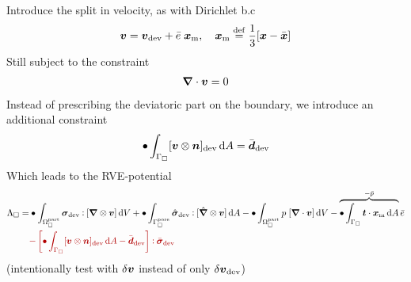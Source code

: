 \documentclass[a4paper]{article}
\newcommand{\pore}{\mathrm{pore}}
\newcommand{\particle}{\mathrm{part}}
\newcommand{\highlight}[1]{{\color{red!70!black}#1}}
\begin{document}
% 
Introduce the split in velocity, as with Dirichlet b.c
\begin{gather}
 \boldsymbol{v} = \boldsymbol{v}_{\mathrm{dev}} + \bar{e}\;\boldsymbol{x}_{\mathrm{m}}, \quad \boldsymbol{x}_{\mathrm{m}} \overset{\mathrm{def}}{=} \frac13 [\boldsymbol{x} - \bar{\boldsymbol{x}}]
\end{gather}
Still subject to the constraint
\begin{gather}
 \boldsymbol{\nabla} \cdot \boldsymbol{v} = 0
\end{gather}
Instead of prescribing the deviatoric part on the boundary, we introduce an additional constraint
\begin{gather}
 \bullet \int_{\Gamma_\Box}[\boldsymbol{v}\mathbin{\otimes}\boldsymbol{n}]_{\mathrm{dev}} \operatorname{d \!} A = \bar{\boldsymbol{d}}_{\mathrm{dev}}
\end{gather}
Which leads to the RVE-potential
\begin{align}
 \Lambda_\Box =& \bullet\int_{\Omega_\Box^\particle} \ts\sigma_\dev\dprod[\diff\outerp\ta v]\dif V + \bullet\int_{\Gamma_\Box^\pore} \hat{\ts\sigma}_\dev\dprod[\hat{\diff}\outerp\ta v]\dif A - \bullet\int_{\Omega_\Box^\particle} p\;[\diff\cdot\ta v] \dif V
 - \overbrace{\bullet\int_{\Gamma_\Box} \ta t\cdot \ta x_\mean\dif A}^{-\bar{p}}\bar{e}
 \nonumber\\
 &\highlight{- \left[\bullet \int_{\Gamma_\Box} [\ta v\outerp\ta n]_\dev\dif A - \bar{\ts d}_\dev\right]\dprod \bar{\ts\sigma}_\dev}
\end{align}
(intentionally test with $\delta\boldsymbol{v}$ instead of only $\delta\boldsymbol{v}_{\mathrm{dev}}$)
\end{document}
